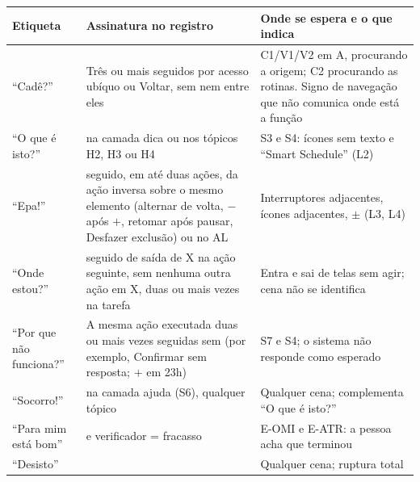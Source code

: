\begin{tabularx}{\textwidth}{@{}P{2.2cm}YP{4.4cm}@{}}
\toprule
\textbf{Etiqueta} & \textbf{Assinatura no registro} & \textbf{Onde se espera e o que indica} \\
\midrule
``Cadê?'' & Três ou mais  seguidos por acesso ubíquo ou Voltar, sem  nem  entre eles & C1/V1/V2 em A, procurando a origem; C2 procurando as rotinas. Signo de navegação que não comunica onde está a função \\
``O que é isto?'' &  na camada dica ou nos tópicos H2, H3 ou H4 & S3 e S4: ícones sem texto e ``Smart Schedule'' (L2) \\
``Epa!'' &  seguido, em até duas ações, da ação inversa sobre o mesmo elemento (alternar de volta, $-$ após $+$, retomar após pausar, Desfazer exclusão) ou  no AL & Interruptores adjacentes, ícones adjacentes, $\pm$ (L3, L4) \\
``Onde estou?'' &  seguido de saída de X na ação seguinte, sem nenhuma outra ação em X, duas ou mais vezes na tarefa & Entra e sai de telas sem agir; cena não se identifica \\
``Por que não funciona?'' & A mesma ação executada duas ou mais vezes seguidas sem  (por exemplo, Confirmar sem resposta; $+$ em 23h) & S7 e S4; o sistema não responde como esperado \\
``Socorro!'' &  na camada ajuda (S6), qualquer tópico & Qualquer cena; complementa ``O que é isto?'' \\
``Para mim está bom'' &  e verificador = fracasso & E-OMI e E-ATR: a pessoa acha que terminou \\
``Desisto'' &  & Qualquer cena; ruptura total \\
\bottomrule
\end{tabularx}
